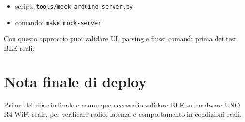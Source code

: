 \begin{itemize}
  \item script: \texttt{tools/mock\_arduino\_server.py}
  \item comando: \texttt{make mock-server}
\end{itemize}

Con questo approccio puoi validare UI, parsing e flussi comandi prima dei test BLE reali.

\section{Nota finale di deploy}
Prima del rilascio finale e comunque necessario validare BLE su hardware UNO R4 WiFi reale, per verificare radio, latenza e comportamento in condizioni reali.

